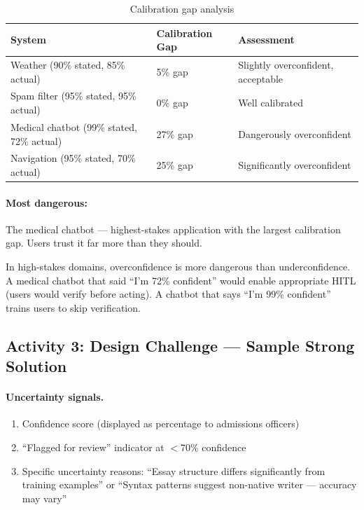 \begin{table}[htbp]
\caption{Calibration gap analysis}
\label{tab:calibration-gaps}
\centering
\begin{tabular}{@{}p{4cm}p{3cm}p{4.5cm}@{}}
\toprule
\textbf{System} & \textbf{Calibration Gap} & \textbf{Assessment} \\
\midrule
Weather (90\% stated, 85\% actual) & 5\% gap & Slightly overconfident, acceptable \\
Spam filter (95\% stated, 95\% actual) & 0\% gap & Well calibrated \\
Medical chatbot (99\% stated, 72\% actual) & 27\% gap & Dangerously overconfident \\
Navigation (95\% stated, 70\% actual) & 25\% gap & Significantly overconfident \\
\bottomrule
\end{tabular}
\end{table}

\paragraph{Most dangerous:} The medical chatbot --- highest-stakes application with the largest calibration gap. Users trust it far more than they should.

\begin{technote}
In high-stakes domains, overconfidence is more dangerous than underconfidence. A medical chatbot that said ``I'm 72\% confident'' would enable appropriate HITL (users would verify before acting). A chatbot that says ``I'm 99\% confident'' trains users to skip verification.
\end{technote}

\subsection{Activity 3: Design Challenge --- Sample Strong Solution}

\paragraph{Uncertainty signals.}
\begin{enumerate}
    \item Confidence score (displayed as percentage to admissions officers)
    \item ``Flagged for review'' indicator at $<$70\% confidence
    \item Specific uncertainty reasons: ``Essay structure differs significantly from training examples'' or ``Syntax patterns suggest non-native writer --- accuracy may vary''
\end{enumerate}

